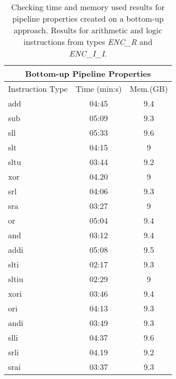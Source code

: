 \begin{table*}[htb!] 
	\centering 
	\caption{Checking time and memory used results for pipeline properties created on a bottom-up approach. Results for arithmetic and logic instructions from types \textit{ENC\_R} and \textit{ENC\_I\_I}.} 
	\label{tab:bottom-up-check-resutls-arithm}
		\begin{tabular}{p{4cm}cc}
          \multicolumn{3}{c}{\textbf{Bottom-up Pipeline Properties}} \\
          \hline
         Instruction Type & Time (min:s) & Mem.(GB)  \\
          \hline
        add     & 04:45 & 9.4  \\
        sub    & 05:09 & 9.3 \\
        sll     & 05:33 & 9.6 \\
        slt    & 04:15 & 9 \\
        sltu    & 03:44 & 9.2 \\
        xor    & 04.20 & 9 \\
        srl    & 04:06 & 9.3 \\
        sra    & 03:27 & 9 \\
        or    & 05:04 & 9.4 \\
        and    & 03:12 & 9.4 \\
        addi    & 05:08 & 9.5 \\
        slti    & 02:17 & 9.3 \\
        sltiu    & 02:29 & 9 \\
        xori    & 03:46 & 9.4 \\
        ori    & 04:13 & 9.3 \\
        andi    & 03:49 & 9.3 \\
        slli    & 04:37 & 9.6 \\
        srli    & 04.19 & 9.2 \\
        srai    & 03:37 & 9.3 \\
\end{tabular}
\end{table*}


